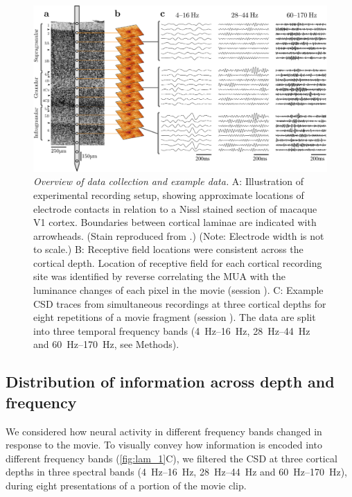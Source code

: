 \begin{figure}[htbp]
\centering \includegraphics[width=\columnwidth]{paperfigs/fig1}
%
\caption{%
\textit{Overview of data collection and example data.}
A: Illustration of experimental recording setup, showing approximate locations of electrode contacts in relation to a Nissl stained section of macaque \ac{V1} cortex.
Boundaries between cortical laminae are indicated with arrowheads.
(Stain reproduced from \cite{Tyler1998}.)
(Note: Electrode width is not to scale.)
B: Receptive field locations were consistent across the cortical depth.
Location of receptive field for each cortical recording site was identified by reverse correlating the \ac{MUA} with the luminance changes of each pixel in the movie (session ).
C: Example \ac{CSD} traces from simultaneous recordings at three cortical depths for eight repetitions of a movie fragment (session ).
The data are split into three temporal frequency bands (\SIrange{4}{16}{Hz}, \SIrange{28}{44}{Hz} and \SIrange{60}{170}{Hz}, see Methods).
}%
\label{fig:lam_1}
%
\end{figure}


\subsection{Distribution of information across depth and frequency}

We considered how neural activity in different frequency bands changed in response to the movie.
To visually convey how information is encoded into different frequency bands (\autoref{fig:lam_1}C), we filtered the \ac{CSD} at three cortical depths in three spectral bands (\SIrange{4}{16}{Hz}, \SIrange{28}{44}{Hz} and \SIrange{60}{170}{Hz}), during eight presentations of a portion of the movie clip.

